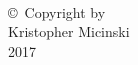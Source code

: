 
\thispagestyle{empty}
\hbox{\ }

\vfill
\renewcommand{\baselinestretch}{1}
\small\normalsize

\vspace{-.65in}

\begin{center}
\large{\copyright \hbox{ }Copyright by\\
Kristopher Micinski  %
\\
2017}
\end{center}

\vfill
